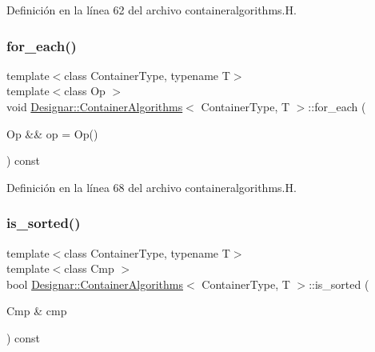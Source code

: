 Definición en la línea 62 del archivo containeralgorithms.\+H.

\mbox{\label{class_designar_1_1_container_algorithms_a5fc63764f264b91fd45fd275ecc0f27a}} 
\subsubsection{\texorpdfstring{for\+\_\+each()}{for\_each()}\hspace{0.1cm}{\footnotesize\ttfamily [2/2]}}
{\footnotesize\ttfamily template$<$class Container\+Type, typename T$>$ \\
template$<$class Op $>$ \\
void \hyperlink{class_designar_1_1_container_algorithms}{Designar\+::\+Container\+Algorithms}$<$ Container\+Type, T $>$\+::for\+\_\+each (\begin{DoxyParamCaption}\item[{Op \&\&}]{op = {\ttfamily Op()} }\end{DoxyParamCaption}) const\hspace{0.3cm}{\ttfamily [inline]}}



Definición en la línea 68 del archivo containeralgorithms.\+H.

\mbox{\label{class_designar_1_1_container_algorithms_a7cbb0be554a1f4bad257b2d171be9bec}} 
\subsubsection{\texorpdfstring{is\+\_\+sorted()}{is\_sorted()}\hspace{0.1cm}{\footnotesize\ttfamily [1/2]}}
{\footnotesize\ttfamily template$<$class Container\+Type, typename T$>$ \\
template$<$class Cmp $>$ \\
bool \hyperlink{class_designar_1_1_container_algorithms}{Designar\+::\+Container\+Algorithms}$<$ Container\+Type, T $>$\+::is\+\_\+sorted (\begin{DoxyParamCaption}\item[{Cmp \&}]{cmp }\end{DoxyParamCaption}) const\hspace{0.3cm}{\ttfamily [inline]}}



